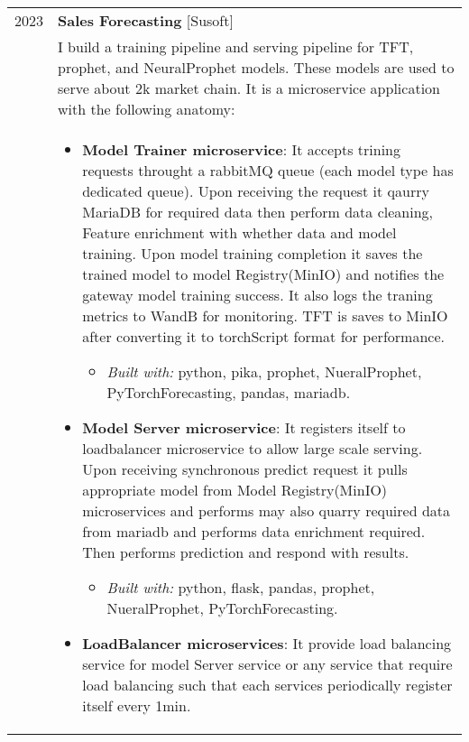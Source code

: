 \documentclass[a4paper,10pt]{article}
\begin{document}
\begin{longtable}{r p{16cm}}
        2023 & \textbf{Sales Forecasting} [Susoft] \\&
        I build a training pipeline and serving pipeline for TFT, prophet, and NeuralProphet models. These models are used to serve about 2k market chain. It is a microservice application with the following anatomy:\\& 
        \begin{itemize}
            \item \textbf{Model Trainer microservice}: It accepts trining requests throught a rabbitMQ queue (each model type has dedicated queue). Upon receiving the request it qaurry MariaDB for required data then perform data cleaning, Feature enrichment with whether data and model training. Upon model training completion it saves the trained model to model Registry(MinIO) and notifies the gateway model training success. It also logs the traning metrics to WandB for monitoring. TFT is saves to MinIO after converting it to torchScript format for performance. 
            \begin{itemize}
                \item \textit{Built with: } python, pika, prophet, NueralProphet, PyTorchForecasting, pandas, mariadb. 
            \end{itemize}
        \end{itemize} 
        \begin{itemize}
            \item \textbf{Model Server microservice}: It registers itself to loadbalancer microservice to allow large scale serving. Upon receiving synchronous predict request it pulls appropriate model from Model Registry(MinIO) microservices and performs may also quarry required data from mariadb and performs data enrichment required. Then performs prediction and respond with results.
            \begin{itemize}
                \item \textit{Built with: }python, flask, pandas,  prophet, NueralProphet, PyTorchForecasting. 
            \end{itemize}
        \end{itemize} 
        \begin{itemize}
            \item \textbf{LoadBalancer microservices}: It provide load balancing service for model Server service or any service that require load balancing such that each services periodically register itself every 1min.
            \begin{itemize}

\end{itemize}
\end{itemize}
\end{longtable}
\end{document}

